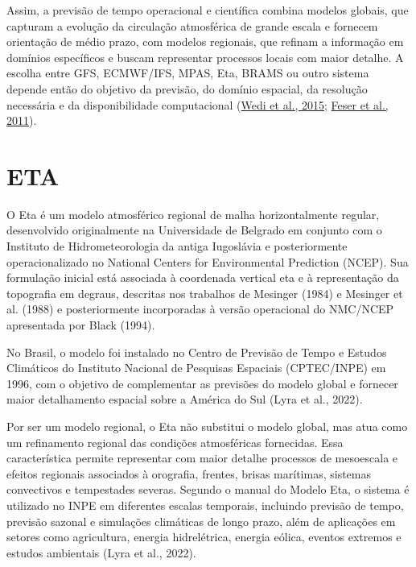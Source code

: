 \documentclass[12pt,a4paper,oneside]{book}
\begin{document}
Assim, a previsão de tempo operacional e científica combina modelos globais, que capturam a evolução da circulação atmosférica de grande escala e fornecem orientação de médio prazo, com modelos regionais, que refinam a informação em domínios específicos e buscam representar processos locais com maior detalhe. A escolha entre GFS, ECMWF/IFS, MPAS, Eta, BRAMS ou outro sistema depende então do objetivo da previsão, do domínio espacial, da resolução necessária e da disponibilidade computacional (\href{https://www.ecmwf.int/sites/default/files/elibrary/2015/15259-modelling-infrastructure-integrated-forecasting-system-recent-advances-and-future-challenges.pdf}{Wedi et al., 2015}; \href{https://www.hereon.de/imperia/md/content/gkss/zentrale_einrichtungen/bibliothek/journals/2011/feser_29114.pdf}{Feser et al., 2011}).

\section{ETA}

O Eta é um modelo atmosférico regional de malha horizontalmente regular, desenvolvido originalmente na Universidade de Belgrado em conjunto com o Instituto de Hidrometeorologia da antiga Iugoslávia e posteriormente operacionalizado no National Centers for Environmental Prediction (NCEP). Sua formulação inicial está associada à coordenada vertical eta e à representação da topografia em degraus, descritas nos trabalhos de Mesinger (1984) e Mesinger et al. (1988) e posteriormente incorporadas à versão operacional do NMC/NCEP apresentada por Black (1994).

No Brasil, o modelo foi instalado no Centro de Previsão de Tempo e Estudos Climáticos do Instituto Nacional de Pesquisas Espaciais (CPTEC/INPE) em 1996, com o objetivo de complementar as previsões do modelo global e fornecer maior detalhamento espacial sobre a América do Sul (Lyra et al., 2022).

Por ser um modelo regional, o Eta não substitui o modelo global, mas atua como um refinamento regional das condições atmosféricas fornecidas. Essa característica permite representar com maior detalhe processos de mesoescala e efeitos regionais associados à orografia, frentes, brisas marítimas, sistemas convectivos e tempestades severas. Segundo o manual do Modelo Eta, o sistema é utilizado no INPE em diferentes escalas temporais, incluindo previsão de tempo, previsão sazonal e simulações climáticas de longo prazo, além de aplicações em setores como agricultura, energia hidrelétrica, energia eólica, eventos extremos e estudos ambientais (Lyra et al., 2022).
\end{document}
